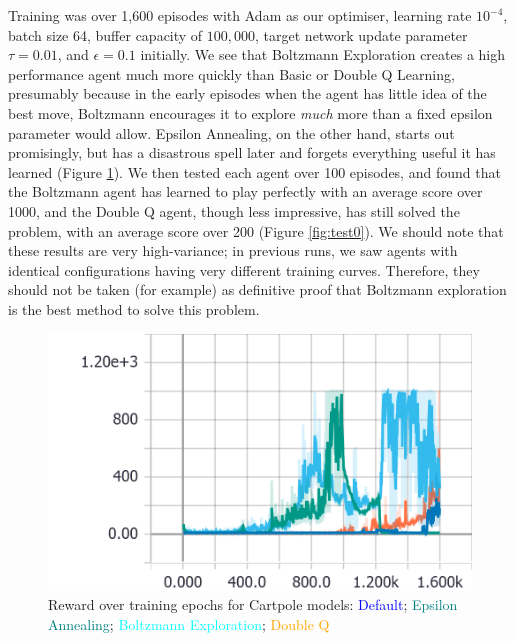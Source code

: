 \documentclass[a4paper, 11pt, conference]{ieeeconf}      %
\begin{document}
Training was over 1,600 episodes with Adam as our optimiser, learning rate $10^{-4}$, batch size 64, buffer capacity of $100,000$, target network update parameter $\tau=0.01$, and $\epsilon=0.1$ initially. We see that Boltzmann Exploration creates a high performance agent much more quickly than Basic or Double Q Learning, presumably because in the early episodes when the agent has little idea of the best move, Boltzmann encourages it to explore \textit{much} more than a fixed epsilon parameter would allow. Epsilon Annealing, on the other hand, starts out promisingly, but has a disastrous spell later and forgets everything useful it has learned (Figure \ref{fig:train0}). We then tested each agent over 100 episodes, and found that the Boltzmann agent has learned to play perfectly with an average score over 1000, and the Double Q agent, though less impressive, has still solved the problem, with an average score over 200 (Figure \ref{fig:test0}). We should note that these results are very high-variance; in previous runs, we saw agents with identical configurations having very different training curves. Therefore, they should not be taken (for example) as definitive proof that Boltzmann exploration is the best method to solve this problem.

\begin{figure}
  \includegraphics[width=\linewidth]{figs/cartpole_reward.png}
  \caption{Reward over training epochs for Cartpole models: \textcolor{blue}{Default}; \textcolor{teal}{Epsilon Annealing}; \textcolor{cyan}{Boltzmann Exploration}; \textcolor{orange}{Double Q}}
  \label{fig:train0}
\end{figure}
\end{document}
